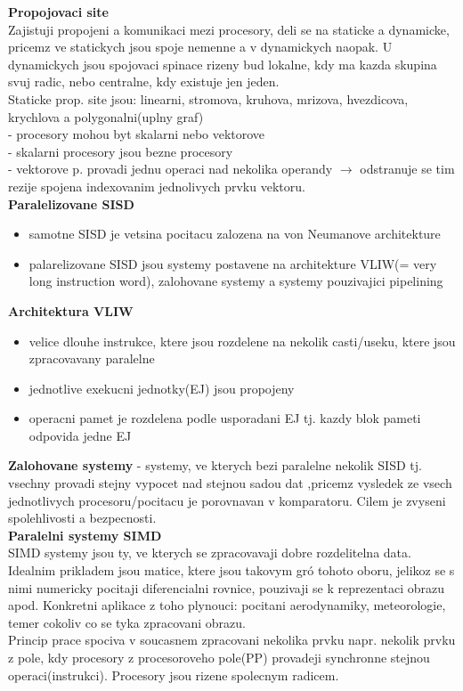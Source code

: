 \documentclass[10pt]{article}
\begin{document}
\textbf{Propojovaci site}\\
Zajistuji propojeni a komunikaci mezi procesory, deli se na staticke a dynamicke, pricemz ve statickych jsou spoje nemenne a v dynamickych naopak. U dynamickych jsou spojovaci spinace rizeny bud lokalne, kdy ma kazda skupina svuj radic, nebo centralne, kdy existuje jen jeden.\\
Staticke prop. site jsou: linearni, stromova, kruhova, mrizova, hvezdicova, krychlova a polygonalni(uplny graf)\\

- procesory mohou byt skalarni nebo vektorove\\
- skalarni procesory jsou bezne procesory\\
- vektorove p. provadi jednu operaci nad nekolika operandy $\rightarrow$ odstranuje se tim rezije spojena indexovanim jednolivych prvku vektoru.\\

\renewcommand{\labelitemi}{$-$}
\textbf{Paralelizovane SISD}
\begin{itemize}
	\item samotne SISD je vetsina pocitacu zalozena na von Neumanove architekture
	\item palarelizovane SISD jsou systemy postavene na architekture VLIW(= very long instruction word), zalohovane systemy a systemy pouzivajici pipelining
\end{itemize}

\textbf{Architektura VLIW}
\begin{itemize}
\item velice dlouhe instrukce, ktere jsou rozdelene na nekolik casti/useku, ktere jsou zpracovavany paralelne
\item jednotlive exekucni jednotky(EJ) jsou propojeny
\item operacni pamet je rozdelena podle usporadani EJ tj. kazdy blok pameti odpovida jedne EJ
\end{itemize}


\textbf{Zalohovane systemy} - systemy, ve kterych bezi paralelne nekolik SISD tj. vsechny provadi stejny vypocet nad stejnou sadou dat ,pricemz vysledek ze vsech jednotlivych procesoru/pocitacu je porovnavan v komparatoru. Cilem je zvyseni spolehlivosti a bezpecnosti.\\

\textbf{Paralelni systemy SIMD}\\
SIMD systemy jsou ty, ve kterych se zpracovavaji dobre rozdelitelna data. Idealnim prikladem jsou matice, ktere jsou takovym gr\'{o} tohoto oboru, jelikoz se s nimi numericky pocitaji diferencialni rovnice, pouzivaji se k reprezentaci obrazu apod. Konkretni aplikace z toho plynouci: pocitani aerodynamiky, meteorologie, temer cokoliv co se tyka zpracovani obrazu.\\[10pt]
Princip prace spociva v soucasnem zpracovani nekolika prvku napr. nekolik prvku z pole, kdy procesory z procesoroveho pole(PP) provadeji synchronne stejnou operaci(instrukci). Procesory jsou rizene spolecnym radicem.\\
\end{document}

